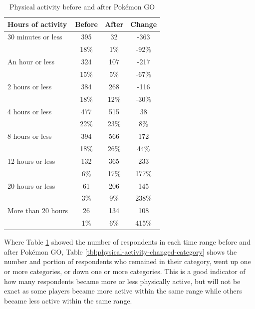 \begin{table}[h]
	\centering
	\caption{Physical activity before and after Pokémon GO}
	\label{tbl:physical-activity-before-and-after}
	\begin{tabular}{|l|c|c|c|}
		\hline
		\textbf{Hours of activity} & \textbf{Before} & \textbf{After} & \textbf{Change} \\\hline\hline
		30 minutes or less	& 395 & 32 & -363\\
							& 18\% & 1\% & -92\%\\\hline
		An hour or less & 324 & 107 & -217\\
						& 15\% & 5\% & -67\%\\\hline
		2 hours or less & 384 & 268 & -116\\
						& 18\% & 12\% & -30\%\\\hline
		4 hours or less & 477 & 515 & 38\\
						& 22\% & 23\% & 8\%\\\hline
		8 hours or less & 394 & 566 & 172\\
						& 18\% & 26\% & 44\%\\\hline
		12 hours or less	& 132 & 365 & 233\\
							& 6\% & 17\% & 177\%\\\hline
		20 hours or less	& 61 & 206 & 145\\
							& 3\% & 9\% & 238\%\\\hline
		More than 20 hours	& 26 & 134 & 108\\
							& 1\% & 6\% & 415\%\\\hline
	\end{tabular}
\end{table}

Where Table \ref{tbl:physical-activity-before-and-after} showed the number of respondents in each time range before and after Pokémon GO, Table \ref{tbl:physical-activity-changed-category} shows the number and portion of respondents who remained in their category, went up one or more categories, or down one or more categories. This is a good indicator of how many respondents became more or less physically active, but will not be exact as some players became more active within the same range while others became less active within the same range.

